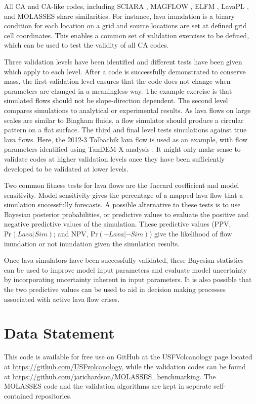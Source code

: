 	All CA and CA-like codes, including SCIARA \citep{crisci2004simulation}, MAGFLOW \citep{del2008simulations}, ELFM \citep{damiani2006lava}, LavaPL \citep{connor2012}, and MOLASSES share similarities. For instance, lava inundation is a binary condition for each location on a grid and source locations are set at defined grid cell coordinates. This enables a common set of validation exercises to be defined, which can be used to test the validity of all CA codes.
	
	Three validation levels have been identified and different tests have been given which apply to each level. After a code is successfully demonstrated to conserve mass, the first validation level ensures that the code does not change when parameters are changed in a meaningless way. The example exercise is that simulated flows should not be slope-direction dependent. The second level compares simulations to analytical or experimental results. As lava flows on large scales are similar to Bingham fluids, a flow simulator should produce a circular pattern on a flat surface. The third and final level tests simulations against true lava flows. Here, the 2012-3 Tolbachik lava flow is used as an example, with flow parameters identified using TanDEM-X analysis \citep{kubanek2015lava}. It might only make sense to validate codes at higher validation levels once they have been sufficiently developed to be validated at lower levels.
	
	Two common fitness tests for lava flows are the Jaccard coefficient and model sensitivity. Model sensitivity gives the percentage of a mapped lava flow that a simulation successfully forecasts. A possible alternative to these tests is to use Bayesian posterior probabilities, or predictive values to evaluate the positive and negative predictive values of the simulation. These predictive values (PPV, $\text{Pr}(Lava|Sim)$; and NPV, $\text{Pr}(\neg Lava|\neg Sim)$) give the likelihood of flow inundation or not inundation given the simulation results.
	
	Once lava simulators have been successfully validated, these Bayesian statistics can be used to improve model input parameters and evaluate model uncertainty by incorporating uncertainty inherent in input parameters. It is also possible that the two predictive values can be used to aid in decision making processes associated with active lava flow crises.
	
	
\section{Data Statement}
This code is available for free use on GitHub at the USFVolcanology page located at \url{https://github.com/USFvolcanology}, while the validation codes can be found at \url{https://github.com/jarichardson/MOLASSES_benchmarking}. The MOLASSES code and the validation algorithms are kept in seperate self-contained repositories.

